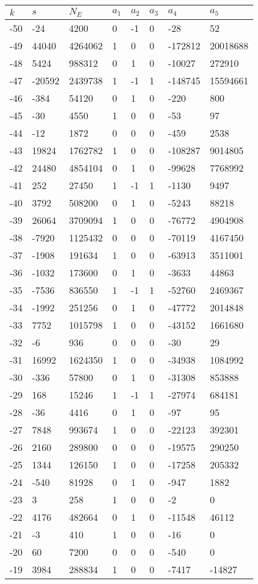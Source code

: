 \documentclass{amsart}
\begin{document}
\begin{longtable}{|l|l|l|lllll|}
\hline
$k$ & $s$ & $N_E$ & $a_1$ & $a_2$ & $a_3$ & $a_4$ & $a_5$\\
\hline
-50&-24&4200&0&-1&0&-28&52\\
-49&44040&4264062&1&0&0&-172812&20018688\\
-48&5424&988312&0&1&0&-10027&272910\\
-47&-20592&2439738&1&-1&1&-148745&15594661\\
-46&-384&54120&0&1&0&-220&800\\
-45&-30&4550&1&0&0&-53&97\\
-44&-12&1872&0&0&0&-459&2538\\
-43&19824&1762782&1&0&0&-108287&9014805\\
-42&24480&4854104&0&1&0&-99628&7768992\\
-41&252&27450&1&-1&1&-1130&9497\\
-40&3792&508200&0&1&0&-5243&88218\\
-39&26064&3709094&1&0&0&-76772&4904908\\
-38&-7920&1125432&0&0&0&-70119&4167450\\
-37&-1908&191634&1&0&0&-63913&3511001\\
-36&-1032&173600&0&1&0&-3633&44863\\
-35&-7536&836550&1&-1&1&-52760&2469367\\
-34&-1992&251256&0&1&0&-47772&2014848\\
-33&7752&1015798&1&0&0&-43152&1661680\\
-32&-6&936&0&0&0&-30&29\\
-31&16992&1624350&1&0&0&-34938&1084992\\
-30&-336&57800&0&1&0&-31308&853888\\
-29&168&15246&1&-1&1&-27974&684181\\
-28&-36&4416&0&1&0&-97&95\\
-27&7848&993674&1&0&0&-22123&392301\\
-26&2160&289800&0&0&0&-19575&290250\\
-25&1344&126150&1&0&0&-17258&205332\\
-24&-540&81928&0&1&0&-947&1882\\
-23&3&258&1&0&0&-2&0\\
-22&4176&482664&0&1&0&-11548&46112\\
-21&-3&410&1&0&0&-16&0\\
-20&60&7200&0&0&0&-540&0\\
-19&3984&288834&1&0&0&-7417&-14827\\

\end{longtable}
\end{document}
